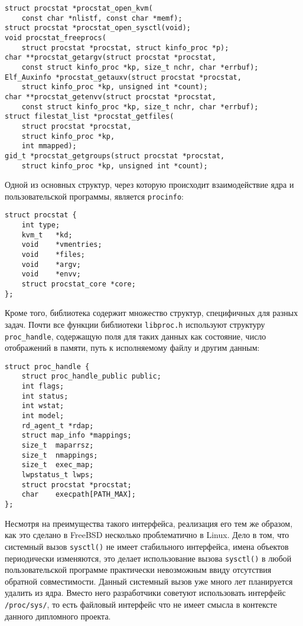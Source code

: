 \medskip
\begin{lstlisting}[style=cstyle]
struct procstat *procstat_open_kvm(
    const char *nlistf, const char *memf);
struct procstat *procstat_open_sysctl(void);
void procstat_freeprocs(
    struct procstat *procstat, struct kinfo_proc *p);
char **procstat_getargv(struct procstat *procstat,
    const struct kinfo_proc *kp, size_t nchr, char *errbuf);
Elf_Auxinfo *procstat_getauxv(struct procstat *procstat,
    struct kinfo_proc *kp, unsigned int *count);
char **procstat_getenvv(struct procstat *procstat,
    const struct kinfo_proc *kp, size_t nchr, char *errbuf);
struct filestat_list *procstat_getfiles(
    struct procstat *procstat,
    struct kinfo_proc *kp,
    int mmapped);
gid_t *procstat_getgroups(struct procstat *procstat,
    struct kinfo_proc *kp, unsigned int *count);
\end{lstlisting}
\medskip

Одной из основных структур, через которую происходит взаимодействие ядра и
пользовательской программы, является \texttt{procinfo}:

\medskip
\begin{lstlisting}[style=cstyle]
struct procstat {
	int	type;
	kvm_t	*kd;
	void	*vmentries;
	void	*files;
	void	*argv;
	void	*envv;
	struct procstat_core *core;
};
\end{lstlisting}
\medskip

Кроме того, библиотека содержит множество структур, специфичных для разных задач.
Почти все функции библиотеки \texttt{libproc.h} используют структуру
\texttt{proc\_handle}, содержащую поля для таких данных как состояние, число
отображений в памяти, путь к исполняемому файлу и другим данным:

\medskip
\begin{lstlisting}[style=cstyle]
struct proc_handle {
	struct proc_handle_public public;
	int	flags;
	int	status;
	int	wstat;
	int	model;
	rd_agent_t *rdap;
	struct map_info *mappings;
	size_t	maparrsz;
	size_t	nmappings;
	size_t	exec_map;
	lwpstatus_t lwps;
	struct procstat *procstat;
	char	execpath[PATH_MAX];
};
\end{lstlisting}
\medskip

Несмотря на преимущества такого интерфейса, реализация его тем же образом, как
это сделано в FreeBSD несколько проблематично в Linux. Дело в том, что системный
вызов \texttt{sysctl()} не имеет стабильного интерфейса, имена объектов
периодически изменяются, это делает использование  вызова \texttt{sysctl()} в
любой пользовательской программе практически невозможным ввиду отсутствия
обратной совместимости. Данный системный вызов уже много лет планируется удалить
из ядра. Вместо него разработчики советуют использовать интерфейс
\texttt{/proc/sys/}, то есть файловый интерфейс что не имеет смысла в контексте
данного дипломного проекта.

